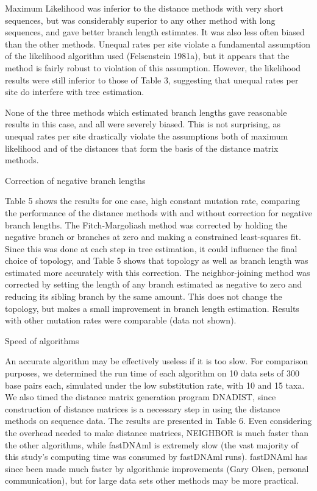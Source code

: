 	Maximum Likelihood was inferior to the distance methods with very short 
sequences, but was considerably superior to any other method with 
long sequences, and gave better branch length estimates.  It was 
also less often biased than the other methods.  Unequal rates 
per site violate a fundamental assumption of the likelihood 
algorithm used (Felsenstein 1981a), but it appears that the method 
is fairly robust to violation of this assumption.  However, the 
likelihood results were still inferior to those of Table 3, suggesting 
that unequal rates per site do interfere with tree estimation.

	None of the three methods which estimated branch lengths 
gave reasonable 
results in this case, and all were severely biased.  This is not 
surprising, as unequal rates per site drastically violate the 
assumptions both of maximum likelihood and of the distances that form
the basis of the distance matrix methods.
\bigskip

\bigskip

\noindent
Correction of negative branch lengths
\bigskip

Table 5 shows the results for one case, high constant mutation rate,
comparing the performance of the distance methods with and without
correction for negative branch lengths.  The Fitch-Margoliash method was
corrected by holding the negative branch or branches at zero and making
a constrained least-squares fit.  Since this was done at each step in
tree estimation, it could influence the final choice of topology, and
Table 5 shows that topology as well as branch length was estimated more
accurately with this correction.  The neighbor-joining method was
corrected by setting the length of any branch estimated as negative to
zero and reducing its sibling branch by the same amount.  This does not
change the topology, but makes a small improvement in branch length
estimation.  Results with other mutation rates were
comparable (data not shown).

\bigskip

\bigskip

\noindent
Speed of algorithms
\bigskip


 An accurate algorithm may be 
effectively useless if it is too slow.  For comparison purposes, we 
determined the run time of each algorithm on 10 data sets of 300 
base pairs each, simulated under the low substitution rate, with 10 and 
15 taxa.  We also timed the distance matrix generation program 
DNADIST, since construction of distance matrices is a necessary 
step in using the distance methods on sequence data.  The results are 
presented in Table 6.  Even considering the overhead needed to make 
distance matrices, NEIGHBOR is much faster than the other 
algorithms, while fastDNAml is extremely slow (the vast majority of 
this study's computing time was consumed by fastDNAml runs).  fastDNAml 
has since been made much faster by algorithmic improvements (Gary Olsen, 
personal communication), but for large data sets other methods may 
be more practical.

